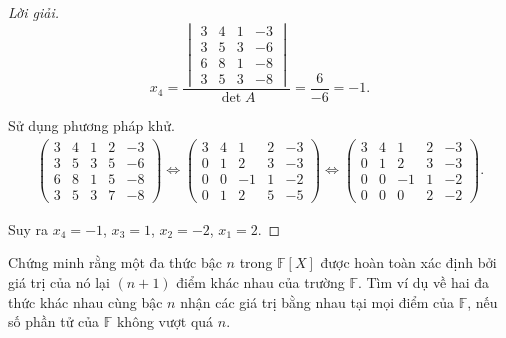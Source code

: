 \documentclass[class=linear-algebra,crop=false]{standalone}
\begin{document}
\begin{proof}[Lời giải]
\[	\]
	\[
		x_{4} = \dfrac{
			\begin{vmatrix}
				3 & 4 & 1 & -3 \\
				3 & 5 & 3 & -6 \\
				6 & 8 & 1 & -8 \\
				3 & 5 & 3 & -8
			\end{vmatrix}
		}{\det A} = \dfrac{6}{-6} = -1.
	\]
	\bigskip
	\par Sử dụng phương pháp khử.
	\begingroup{}
	\allowdisplaybreaks{}
	\begin{gather*}
		\left(\begin{array}{cccc|c}
				3 & 4 & 1 & 2 & -3 \\
				3 & 5 & 3 & 5 & -6 \\
				6 & 8 & 1 & 5 & -8 \\
				3 & 5 & 3 & 7 & -8
			\end{array}
		\right)
		\Longleftrightarrow{}
		\left(\begin{array}{cccc|c}
				3 & 4 & 1  & 2 & -3 \\
				0 & 1 & 2  & 3 & -3 \\
				0 & 0 & -1 & 1 & -2 \\
				0 & 1 & 2  & 5 & -5
			\end{array}
		\right)
		\Longleftrightarrow{}
		\left(\begin{array}{cccc|c}
				3 & 4 & 1  & 2 & -3 \\
				0 & 1 & 2  & 3 & -3 \\
				0 & 0 & -1 & 1 & -2 \\
				0 & 0 & 0  & 2 & -2
			\end{array}
		\right).
	\end{gather*}
	\endgroup{}
	\par Suy ra $x_{4} = -1$, $x_{3} = 1$, $x_{2} = -2$, $x_{1} = 2$.
\end{proof}

\begin{exercise}
	\par Chứng minh rằng một đa thức bậc $n$ trong $\mathbb{F}[X]$ được hoàn toàn xác định bởi giá trị của nó lại $(n+1)$ điểm khác nhau của trường $\mathbb{F}$. Tìm ví dụ về hai đa thức khác nhau cùng bậc $n$ nhận các giá trị bằng nhau tại mọi điểm của $\mathbb{F}$, nếu số phần tử của $\mathbb{F}$ không vượt quá $n$.
\end{exercise}
\end{document}
